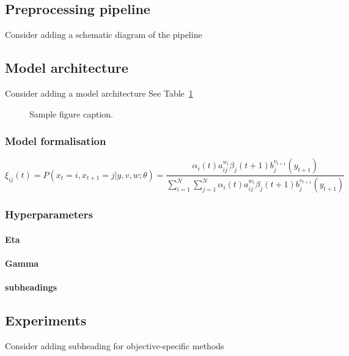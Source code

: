 \documentclass{article}
\begin{document}
    \subsection{Preprocessing pipeline} Consider adding a schematic diagram of the pipeline
    
    \subsection{Model architecture} Consider adding a model architecture
    See Table~\ref{fig:modelarch}
    
    \begin{figure}[h]
      \centering
      \fbox{\rule[-.5cm]{4cm}{4cm} \rule[-.5cm]{4cm}{0cm}}
      \caption{Sample figure caption.}
      \label{fig:modelarch}
    \end{figure}
    
        \subsubsection{Model formalisation}
            \begin{equation}
            \xi _{ij}(t)=P(x_{t}=i,x_{t+1}=j|y,v,w;\theta)= {\frac {\alpha _{i}(t)a^{w_t}_{ij}\beta _{j}(t+1)b^{v_{t+1}}_{j}(y_{t+1})}{\sum _{i=1}^{N} \sum _{j=1}^{N} \alpha _{i}(t)a^{w_t}_{ij}\beta _{j}(t+1)b^{v_{t+1}}_{j}(y_{t+1})}}
            \end{equation}
        
        \subsubsection{Hyperparameters}
            \paragraph{Eta}
            \paragraph{Gamma}
            \paragraph{subheadings}
    \subsection{Experiments}
        Consider adding subheading for objective-specific methods
    \newpage
\end{document}
